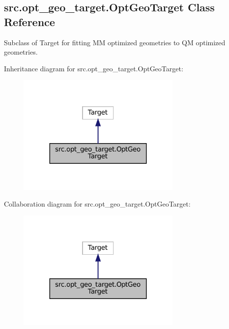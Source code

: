 \hypertarget{classsrc_1_1opt__geo__target_1_1OptGeoTarget}{}\subsection{src.\+opt\+\_\+geo\+\_\+target.\+Opt\+Geo\+Target Class Reference}
\label{classsrc_1_1opt__geo__target_1_1OptGeoTarget}


Subclass of Target for fitting MM optimized geometries to QM optimized geometries.  




Inheritance diagram for src.\+opt\+\_\+geo\+\_\+target.\+Opt\+Geo\+Target\+:
\nopagebreak
\begin{figure}[H]
\begin{center}
\leavevmode
\includegraphics[width=227pt]{classsrc_1_1opt__geo__target_1_1OptGeoTarget__inherit__graph}
\end{center}
\end{figure}


Collaboration diagram for src.\+opt\+\_\+geo\+\_\+target.\+Opt\+Geo\+Target\+:
\nopagebreak
\begin{figure}[H]
\begin{center}
\leavevmode
\includegraphics[width=227pt]{classsrc_1_1opt__geo__target_1_1OptGeoTarget__coll__graph}
\end{center}
\end{figure}
